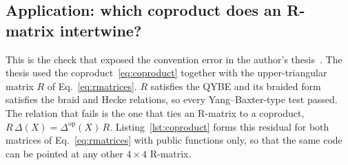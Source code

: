 \documentclass{SciPost}
\begin{document}
\subsection{Application: which coproduct does an R-matrix intertwine?}
\label{sec:ex-coproduct}

This is the check that exposed the convention error in the author's thesis~\cite{terekli2026thesis}. The thesis used the coproduct~\eqref{eq:coproduct} together with the upper-triangular matrix $R$ of Eq.~\eqref{eq:rmatrices}. $R$ satisfies the QYBE and its braided form satisfies the braid and Hecke relations, so every Yang--Baxter-type test passed. The relation that fails is the one that ties an R-matrix to a coproduct, $R\,\Delta(X)=\Delta^{\mathrm{op}}(X)\,R$. Listing~\ref{lst:coproduct} forms this residual for both matrices of Eq.~\eqref{eq:rmatrices} with public functions only, so that the same code can be pointed at any other $4\times4$ R-matrix.
\end{document}
